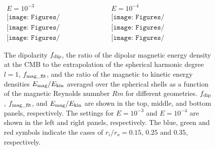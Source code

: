 \begin{figure}
\begin{center}
\[
\begin{array}{cc}
\mbox{$E = 10^{-3}$} &
\mbox{$E = 10^{-4}$} \\
\texttt{[image: Figures/fdip\_vs\_Rm\_Ek3.pdf]} &
\texttt{[image: Figures/fdip\_vs\_Rm\_Ek4.pdf]} \\
\texttt{[image: Figures/ffit\_vs\_Rm\_Ek3.pdf]} &
\texttt{[image: Figures/ffit\_vs\_Rm\_Ek4.pdf]} \\
\texttt{[image: Figures/Eratio\_vs\_Rm\_Ek3.pdf]} &
\texttt{[image: Figures/Eratio\_vs\_Rm\_Ek4.pdf]}
\end{array}
\]
\end{center}
\caption{The dipolarity $f_{\rm dip}$, the ratio of the dipolar magnetic energy density at the CMB to the extrapolation of the spherical harmonic degree $l = 1$, $f_{\rm mag\_fit}$, and the ratio of the magnetic to kinetic energy densities $E_{\rm mag} / E_{\rm kin}$ averaged over the spherical shells as a function of the magnetic Reynolds numnber $Rm$ for different geometries. $f_{\rm dip}$,  $f_{\rm mag\_fit}$, and $E_{\rm mag} / E_{\rm kin}$ are shown in the top, middle, and bottom panels, respectively. The settings for $E = 10^{-3}$ and $E = 10^{-4}$ are shown in the left and right panels, respectively. The blue, green and red symbols indicate the cases of $r_{i} / r_{o} = 0.15$, $0.25$ and $0.35$, respectively. 
}
\label{fig:fdip_fit_Eratio}
\end{figure}